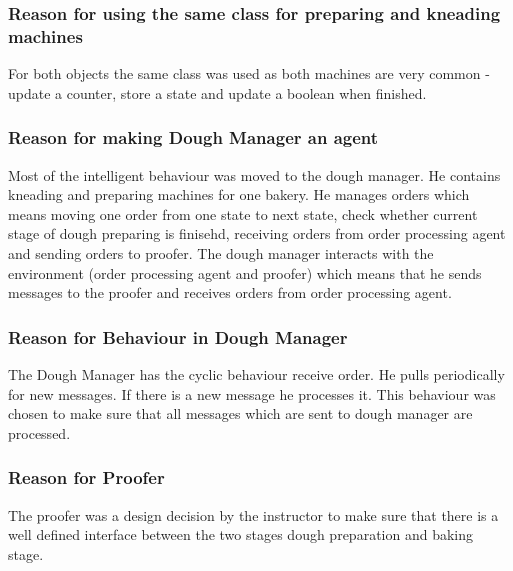 \documentclass[10pt,a4paper]{article}
\begin{document}
		\subsubsection{Reason for using the same class for preparing and kneading machines}
		For both objects the same class was used as both machines are very common - update a counter, store a state and update a boolean when finished.
		\subsubsection{Reason for making Dough Manager an agent}
		Most of the intelligent behaviour was moved to the dough manager. He contains kneading and preparing machines for one bakery. He manages orders which
		means moving one order from one state to next state, check whether current stage of dough preparing is finisehd, receiving orders from order processing agent
		and sending orders to proofer. The dough manager interacts with the environment (order processing agent and proofer) which means that he sends messages to the
		proofer and receives orders from order processing agent.
		\subsubsection{Reason for Behaviour in Dough Manager}
		The Dough Manager has the cyclic behaviour receive order. He pulls periodically for new messages. If there is a new message he processes it. This behaviour was chosen
		to make sure that all messages which are sent to dough manager are processed.
		\subsubsection{Reason for Proofer}
		The proofer was a design decision by the instructor to make sure that there is a well defined interface between the two stages dough preparation and baking stage.
		
\end{document}
